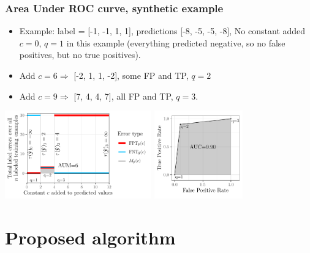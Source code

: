 \documentclass{beamer}
\begin{document}
\begin{frame}
  \frametitle{Area Under ROC curve, synthetic example}

\begin{itemize}
  \item Example: label = [-1, -1, 1, 1], predictions [-8, -5,
  -5, -8], No constant added $c=0$, $q=1$ in this example (everything
  predicted negative, so no false positives, but no true positives).
\item Add $c=6 \Rightarrow$ [-2, 1, 1, -2], some FP and TP, $q=2$
\item  Add $c=9 \Rightarrow$ [7, 4, 4, 7], all FP and TP, $q=3$.
  \end{itemize}

  \includegraphics[height=1.5in]{figure-more-than-one-less-aum}
  \includegraphics[height=1.5in]{figure-more-than-one-less-auc}

\end{frame}


\section{Proposed algorithm}
\end{document}
